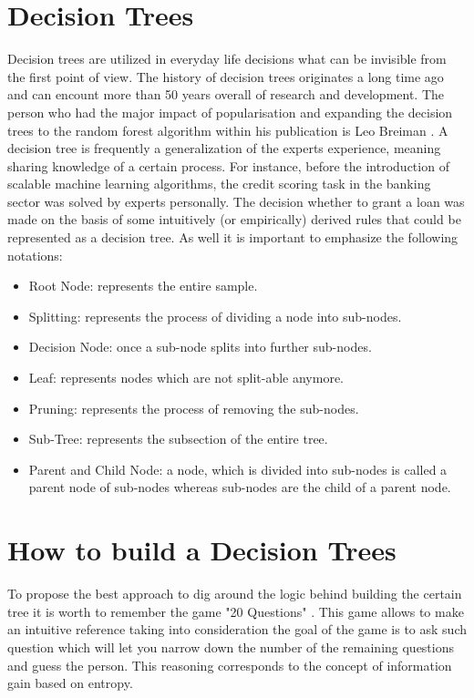 \documentclass{article}
\begin{document}
\section{Decision Trees}
Decision trees are utilized in everyday life decisions what can be invisible from the first point of view. The history of decision trees originates a long time ago and can encount more than 50 years overall of research and development.  
The person who had the major impact of popularisation and expanding the decision trees to the random forest algorithm within his publication is Leo Breiman \cite{Breiman2001}. A decision tree is frequently a generalization of the experts experience, meaning sharing knowledge of a certain process. For instance, before the introduction of scalable machine learning algorithms, the credit scoring task in the banking sector was solved by experts personally. The decision whether to grant a loan was made on the basis of some intuitively (or empirically) derived rules that could be represented as a decision tree. As well it is important to emphasize the following notations:
\begin{itemize}
    \item Root Node: represents the entire sample. 
    \item Splitting: represents the process of dividing a node into sub-nodes. 
    \item Decision Node: once a sub-node splits into further sub-nodes.
    \item Leaf: represents nodes which are not split-able anymore.  
    \item Pruning: represents the process of removing the sub-nodes.
    \item Sub-Tree: represents the subsection of the entire tree.
    \item Parent and Child Node: a node, which is divided into sub-nodes is called a parent node of sub-nodes whereas sub-nodes are the child of a parent node.
\end{itemize}

\section{How to build a Decision Trees}
To propose the best approach to dig around the logic behind building the certain tree it is worth to remember the game "20 Questions" \cite{Stocco2015}. This game allows to make an intuitive reference taking into consideration the goal of the game is to ask such question which will let you narrow down the number of the remaining questions and guess the person. This reasoning corresponds to the concept of information gain based on entropy.
\end{document}
